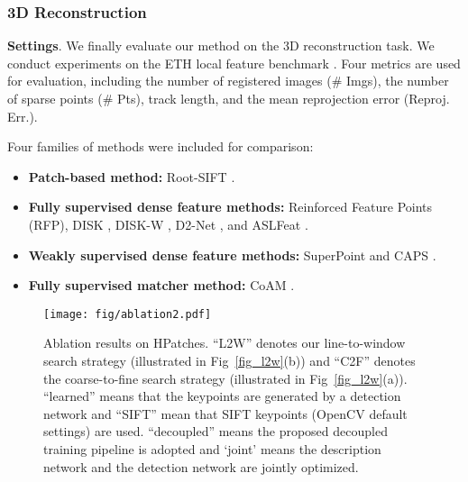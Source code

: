 \documentclass[10pt,twocolumn,letterpaper]{article}
\begin{document}
\subsubsection{3D Reconstruction}
\textbf{Settings}. We finally evaluate our method on the 3D reconstruction task. We conduct experiments on the ETH local feature benchmark \cite{schonberger2017comparative}. Four metrics are used for evaluation, including the number of registered images (\# Imgs), the number of sparse points (\# Pts), track length, and the mean reprojection error (Reproj. Err.).

Four families of methods were included for comparison:
\begin{itemize}
    \item \textbf{ Patch-based method:} Root-SIFT \cite{arandjelovic2012three, lowe2004distinctive}.
    \vspace{-0.25cm}
    
    \item\textbf{ Fully supervised dense feature methods:}  Reinforced Feature Points \cite{bhowmik2020reinforced} (RFP), DISK \cite{tyszkiewiczDISKLearningLocal2020a}, DISK-W \cite{tyszkiewiczDISKLearningLocal2020a}, D2-Net \cite{Dusmanu2019CVPR}, and ASLFeat \cite{luo2020aslfeat}. \vspace{-0.25cm}

    \item\textbf{ Weakly supervised dense feature methods:}  SuperPoint \cite{detone2018superpoint} and CAPS \cite{wangLearningFeatureDescriptors2020}. 
    \vspace{-0.25cm}

    \item\textbf{ Fully supervised matcher method:} CoAM \cite{wiles2021coam}.
    
\end{itemize}
 
\begin{figure}[t]
    \centering
    \texttt{[image: fig/ablation2.pdf]}
    \caption{Ablation results on HPatches. ``L2W'' denotes our line-to-window search strategy (illustrated in Fig~\ref{fig_l2w}(b)) and ``C2F'' denotes the coarse-to-fine search strategy  \cite{wangLearningFeatureDescriptors2020} (illustrated in Fig~\ref{fig_l2w}(a)). ``learned'' means that the keypoints are generated by a detection network and ``SIFT'' mean that SIFT keypoints (OpenCV default settings) are used. ``decoupled'' means the proposed decoupled training pipeline is adopted and `joint' means the description network and the detection network are jointly optimized.}
    \label{fig_ablation_hpatch}
\end{figure}
\end{document}

